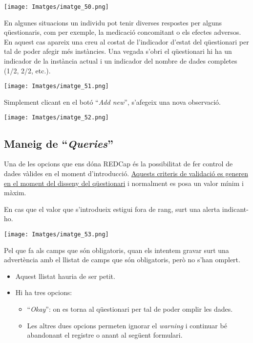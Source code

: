 \documentclass[
]{article}
\providecommand{\tightlist}{%
  \setlength{\itemsep}{0pt}\setlength{\parskip}{0pt}}
\begin{document}
\texttt{[image: Imatges/imatge\_50.png]}

En algunes situacions un individu pot tenir diverses respostes per alguns qüestionaris, com per exemple, la medicació concomitant o els efectes adversos. En aquest cas apareix una creu al costat de l'indicador d'estat del qüestionari per tal de poder afegir més instàncies. Una vegada s'obri el qüestionari hi ha un indicador de la instància actual i un indicador del nombre de dades completes (1/2, 2/2, etc.).

\texttt{[image: Imatges/imatge\_51.png]}

Simplement clicant en el botó ``\emph{Add new}'', s'afegeix una nova observació.

\texttt{[image: Imatges/imatge\_52.png]}

\hypertarget{maneig-de-queries}{%
\subsection{\texorpdfstring{\textbf{Maneig de ``\emph{Queries}''}}{Maneig de ``Queries''}}\label{maneig-de-queries}}

Una de les opcions que ens dóna REDCap és la possibilitat de fer control de dades vàlides en el moment d'introducció. \protect\hyperlink{en16}{Aquests criteris de validació es generen en el moment del disseny del qüestionari} i normalment es posa un valor mínim i màxim.

En cas que el valor que s'introdueix estigui fora de rang, surt una alerta indicant-ho.

\texttt{[image: Imatges/imatge\_53.png]}

Pel que fa als camps que són obligatoris, quan els intentem gravar surt una advertència amb el llistat de camps que són obligatoris, però no s'han omplert.

\begin{itemize}
\tightlist
\item
  Aquest llistat hauria de ser petit.
\item
  Hi ha tres opcions:

  \begin{itemize}
  \tightlist
  \item
    ``\emph{Okay}'': on es torna al qüestionari per tal de poder omplir les dades.
  \item
    Les altres dues opcions permeten ignorar el \emph{warning} i continuar bé abandonant el registre o anant al següent formulari.
  \end{itemize}
\end{itemize}
\end{document}
